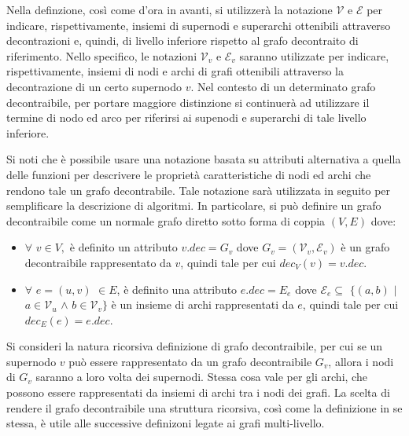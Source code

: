     Nella definzione, cos\`{i} come d'ora in avanti, si utilizzer\`a la notazione $\mathcal{V}$ e $\mathcal{E}$ per
    indicare, rispettivamente, insiemi di supernodi e superarchi ottenibili attraverso decontrazioni e, quindi, di
    livello inferiore rispetto al grafo decontraito di riferimento.
    Nello specifico, le notazioni $\mathcal{V}_v$ e $\mathcal{E}_v$ saranno utilizzate per indicare, rispettivamente,
    insiemi di nodi e archi di grafi ottenibili attraverso la decontrazione di un certo supernodo $v$.
    Nel contesto di un determinato grafo decontraibile, per portare maggiore distinzione si continuer\`a ad utilizzare
    il termine di nodo ed arco per riferirsi ai supenodi e superarchi di tale livello inferiore. \newline

    Si noti che \`e possibile usare una notazione basata su attributi alternativa a quella delle funzioni per
    descrivere le propriet\`a caratteristiche di nodi ed archi che rendono tale un grafo decontrabile.
    Tale notazione sar\`a utilizzata in seguito per semplificare la descrizione di algoritmi. \newline
    In particolare, si pu\`o definire un grafo decontraibile come un normale grafo diretto sotto forma di coppia
    $(V, E)$ dove:
    \begin{itemize}
        \item $\forall$ $v \in V,$ \`e definito un attributo $v.dec = G_v$ dove $G_v = (\mathcal{V}_v, \mathcal{E}_v)$ \`e un
            grafo decontraibile rappresentato da $v$, quindi tale per cui $dec_V(v) = v.dec$.
        \item $\forall$ $e=(u, v)$  $\in E$, \`e definito una attributo $e.dec = E_e$ dove
            $\mathcal{E}_e \subseteq$ $\{(a, b)$ $\mid$ $a \in \mathcal{V}_u$ $\wedge$ $b \in \mathcal{V}_v\}$ \`e un insieme di archi
            rappresentati da $e$, quindi tale per cui $dec_E(e) = e.dec$.
    \end{itemize}

    Si consideri la natura ricorsiva definizione di grafo decontraibile, per cui se un supernodo $v$ pu\`o essere
    rappresentato da un grafo decontraibile $G_v$, allora i nodi di $G_v$ saranno a loro volta dei supernodi.
    Stessa cosa vale per gli archi, che possono essere rappresentati da insiemi di archi tra i nodi dei grafi.
    La scelta di rendere il grafo decontraibile una struttura ricorsiva, cos\`{i} come la definizione in se stessa,
    \`e utile alle successive definizoni legate ai grafi multi-livello. \newline

